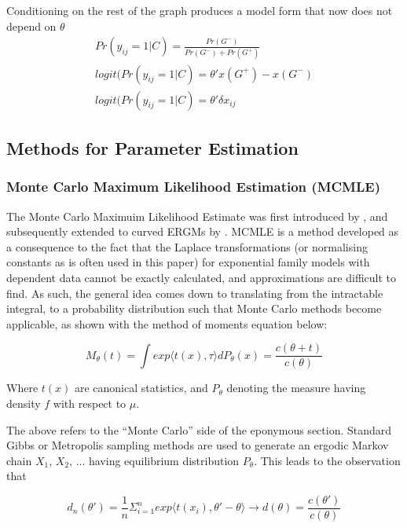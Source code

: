 Conditioning on the rest of the graph produces a model form that now does not depend on $\theta$
\begin{equation}
\begin{aligned}
    Pr(y_{ij} = 1|C) = \frac{Pr(G^-)}{Pr(G^-) + Pr(G^+)} \\
    logit(Pr(y_{ij} = 1|C) = \theta'{x(G^+) - x(G^-)} \\
    \label{eqn:ergm_no_theta}
    logit(Pr(y_{ij} = 1|C) = \theta'\delta x_{ij}
\end{aligned}
\end{equation}

\subsection{Methods for Parameter Estimation}

\subsubsection{Monte Carlo Maximum Likelihood Estimation (MCMLE)}

The Monte Carlo Maximuim Likelihood Estimate was first introduced by \cite{geyerthompson1992}, and subsequently extended to curved ERGMs by \cite{hunterhandcock2006}. MCMLE is a method developed as a consequence to the fact that the  Laplace transformations (or normalising constants as is often used in this paper) for exponential family models with dependent data cannot be exactly calculated, and approximations are difficult to find. As such, the general idea comes down to translating from the intractable integral, to a probability distribution such that Monte Carlo methods become applicable, as shown with the method of moments equation below:

\begin{equation}
M_\theta(t) = \int{exp{\langle t(x), \tau \rangle}dP_\theta(x)} = \frac{c(\theta + t)}{c(\theta)}
\end{equation}

Where $t(x)$ are canonical statistics, and $P_\theta$ denoting the measure having density $f$ with respect to $\mu$.

The above refers to the ``Monte Carlo'' side of the eponymous section. Standard Gibbs or Metropolis sampling methods are used to generate an ergodic Markov chain $X_1$, $X_2$, ... having equilibrium distribution $P_\theta$. This leads to the observation that

\begin{equation}
\label{eq:mcmle_importance_sampling}
d_n(\theta') =  \frac{1}{n}\Sigma_{i=1}^n exp{\langle t(x_i), \theta' - \theta \rangle} \rightarrow d(\theta) = \frac{c(\theta')}{c(\theta)}
\end{equation}

